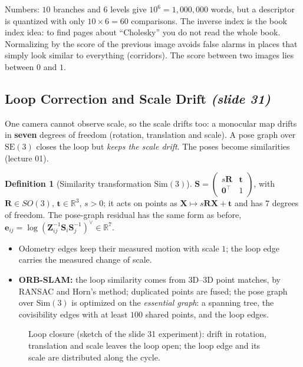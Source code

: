 \documentclass[11pt,a4paper]{article}
\newcommand{\slrs}[1]{\texorpdfstring{\emph{(slide #1)}}{(slide #1)}}
\newcommand{\R}{\mathbb{R}}
\newcommand{\be}{\mathbf{e}}
\newcommand{\bX}{\mathbf{X}}
\newcommand{\SE}{\mathrm{SE}(3)}
\newcommand{\Sim}{\mathrm{Sim}(3)}
\theoremstyle{definition}
\newtheorem{definition}{Definition}[section]
\theoremstyle{plain}
\theoremstyle{remark}
\begin{document}
\begin{intuition}
Numbers: $10$ branches and $6$ levels give $10^6=1{,}000{,}000$ words, but a descriptor is quantized with only $10\times6=60$ comparisons. The inverse index is the book index idea: to find pages about ``Cholesky'' you do not read the whole book. Normalizing by the score of the previous image avoids false alarms in places that simply look similar to everything (corridors). The score between two images lies between $0$ and $1$.
\end{intuition}

\subsection{Loop Correction and Scale Drift \slrs{31}}
One camera cannot observe scale, so the scale drifts too: a monocular map drifts in \textbf{seven} degrees of freedom (rotation, translation and scale). A pose graph over $\SE$ closes the loop but \emph{keeps the scale drift}. The poses become similarities (lecture 01).
\begin{definition}[Similarity transformation $\Sim$]\label{def:sim3}
$\mathbf S=\begin{pmatrix}s\mathbf R&\mathbf t\\\mathbf 0^\top&1\end{pmatrix}$, with $\mathbf R\in SO(3)$, $\mathbf t\in\R^3$, $s>0$; it acts on points as $\bX\mapsto s\mathbf R\bX+\mathbf t$ and has $7$ degrees of freedom. The pose-graph residual has the same form as before, $\be_{ij}=\log(\mathbf Z_{ij}^{-1}\mathbf S_i\mathbf S_j^{-1})^\vee\in\R^7$.
\end{definition}
\begin{itemize}[nosep]
\item Odometry edges keep their measured motion with scale $1$; the loop edge carries the measured change of scale.
\item \textbf{ORB-SLAM:} the loop similarity comes from 3D--3D point matches, by RANSAC and Horn's method; duplicated points are fused; the pose graph over $\Sim$ is optimized on the \emph{essential graph}: a spanning tree, the covisibility edges with at least $100$ shared points, and the loop edges.
\end{itemize}
\begin{figure}[htbp]\centering
{}
\caption{Loop closure (sketch of the slide 31 experiment): drift in rotation, translation and scale leaves the loop open; the loop edge and its scale are distributed along the cycle.}
\end{figure}
\end{document}
